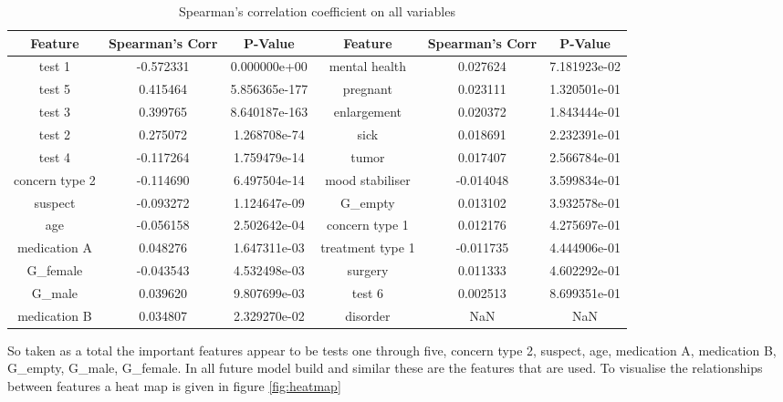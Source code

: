 \documentclass[a4paper]{article}
\begin{document}
\begin{table}[h]
\begin{adjustwidth}{-1.5cm}{}
    \centering
    \begin{tabular}{|c|c|c|c|c|c|}
    \hline
         Feature & Spearman's Corr & P-Value & Feature & Spearman's Corr & P-Value  \\
    \hline
         test 1         & -0.572331 & 0.000000e+00  & mental health    & 0.027624  & 7.181923e-02 \\
    \hline
         test 5         & 0.415464  & 5.856365e-177 & pregnant         & 0.023111  & 1.320501e-01 \\
    \hline
         test 3         & 0.399765  & 8.640187e-163 & enlargement      & 0.020372  & 1.843444e-01 \\
    \hline
         test 2         & 0.275072  & 1.268708e-74  & sick             & 0.018691  & 2.232391e-01 \\
    \hline
         test 4         & -0.117264 & 1.759479e-14  & tumor            & 0.017407  & 2.566784e-01 \\
    \hline
         concern type 2 & -0.114690 & 6.497504e-14  & mood stabiliser  & -0.014048 & 3.599834e-01 \\
    \hline
         suspect        & -0.093272 & 1.124647e-09  & G\_empty         & 0.013102  & 3.932578e-01 \\
    \hline
         age            & -0.056158 & 2.502642e-04  & concern type 1   & 0.012176  & 4.275697e-01 \\
    \hline
         medication A   & 0.048276  & 1.647311e-03  & treatment type 1 & -0.011735 & 4.444906e-01 \\
    \hline
         G\_female      & -0.043543 & 4.532498e-03  & surgery          & 0.011333  & 4.602292e-01 \\
    \hline
         G\_male        & 0.039620  & 9.807699e-03  & test 6           & 0.002513  & 8.699351e-01 \\
    \hline
         medication B   & 0.034807  & 2.329270e-02  & disorder         & NaN       & NaN          \\
    \hline
    \end{tabular}
    \caption{Spearman's correlation coefficient on all variables}
    \label{tab:spearman}
    \end{adjustwidth}
\end{table}

So taken as a total the important features appear to be tests one through five, concern type 2, suspect, age, medication A, medication B, G\_empty, G\_male, G\_female. In all future model build and similar these are the features that are used.
To visualise the relationships between features a heat map is given in figure \ref{fig:heatmap}
\end{document}
